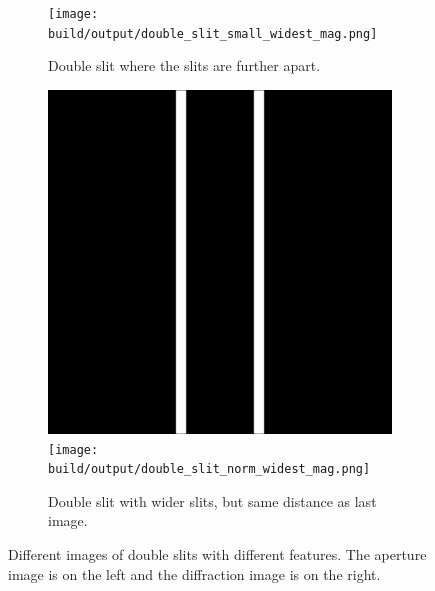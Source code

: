 \begin{figure}[htbp]
\begin{subfigure}[h]{\linewidth}
        \texttt{[image: build/output/double\_slit\_small\_widest\_mag.png]}
        \caption{Double slit where the slits are further apart.}
    \end{subfigure}
    \begin{subfigure}[h]{\linewidth}
        \centering
        \includegraphics[width=.49\linewidth]{images/double_slit_norm_widest.png}
        \texttt{[image: build/output/double\_slit\_norm\_widest\_mag.png]}
        \caption{Double slit with wider slits, but same distance as last image.}
    \end{subfigure}
    \caption{Different images of double slits with different features. The aperture image is on the left and the diffraction image is on the right.}
    \label{fig:double_slit}
\end{figure}